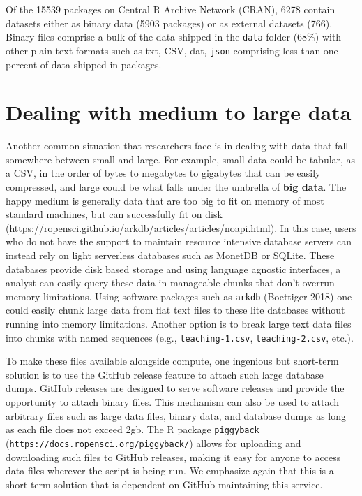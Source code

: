 \documentclass[
]{article}
\begin{document}
Of the 15539 packages on Central R Archive Network (CRAN), 6278 contain
datasets either as binary data (5903 packages) or as external datasets
(766). Binary files comprise a bulk of the data shipped in the \texttt{data}
folder (68\%) with other plain text formats such as txt, CSV, dat,
\texttt{json} comprising less than one percent of data shipped in packages.

\hypertarget{med-large}{%
\section{Dealing with medium to large data}\label{med-large}}

Another common situation that researchers face is in dealing with data that fall somewhere between small and large. For example, small data could be tabular, as a CSV, in the order of bytes to megabytes to gigabytes that can be easily compressed, and large could be what falls under the umbrella of \textbf{big data}. The happy medium is generally data that are too big to fit on memory of most standard machines, but can successfully fit on disk (\url{https://ropensci.github.io/arkdb/articles/articles/noapi.html}). In this case, users who do not have the support to maintain resource intensive database servers can instead rely on light serverless databases such as MonetDB or SQLite. These databases provide disk based storage and using language agnostic interfaces, a analyst can easily query these data in manageable chunks that don't overrun memory limitations. Using software packages such as \texttt{arkdb} (Boettiger 2018) one could easily chunk large data from flat text files to these lite databases without running into memory limitations. Another option is to break large text data files into chunks with named sequences (e.g., \texttt{teaching-1.csv}, \texttt{teaching-2.csv}, etc.).

To make these files available alongside compute, one ingenious but short-term solution is to use the GitHub release feature to attach such large database dumps. GitHub releases are designed to serve software releases and provide the opportunity to attach binary files. This mechanism can also be used to attach arbitrary files such as large data files, binary data, and database dumps as long as each file does not exceed 2gb. The R package \texttt{piggyback} (\texttt{https://docs.ropensci.org/piggyback/}) allows for uploading and downloading such files to GitHub releases, making it easy for anyone to access data files wherever the script is being run. We emphasize again that this is a short-term solution that is dependent on GitHub maintaining this service.
\end{document}
